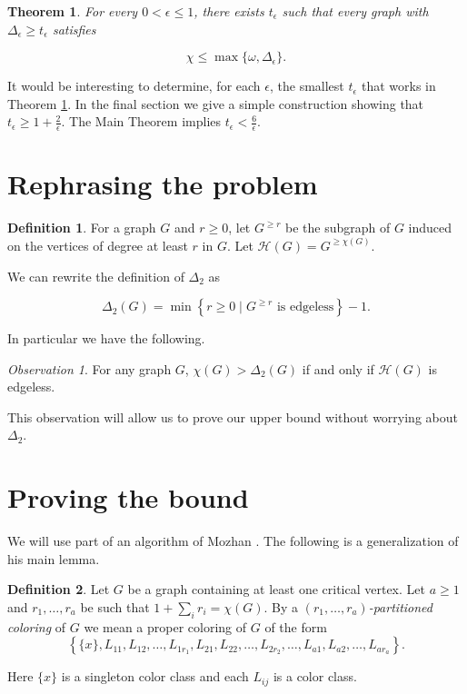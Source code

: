 \documentclass[12pt]{amsart}
\theoremstyle{plain}
\newtheorem{thm}{Theorem}
\theoremstyle{definition}
\newtheorem{defn}{Definition}
\theoremstyle{remark}
\newtheorem*{observation}{Observation}
\begin{document}
\begin{thm}\label{TheoremR}
For every $0 < \epsilon \leq 1$, there exists $t_\epsilon$ such that every graph with $\Delta_\epsilon \geq t_\epsilon$ satisfies 

\[\chi \leq \max\{\omega, \Delta_\epsilon\}.\]
\end{thm}

\noindent It would be interesting to determine, for each $\epsilon$, the smallest $t_\epsilon$ that works in Theorem \ref{TheoremR}. In the final section we give a simple construction showing that $t_\epsilon \geq 1 + \frac{2}{\epsilon}$.  The Main Theorem implies $t_\epsilon < \frac{6}{\epsilon}$.

\section{Rephrasing the problem}

\begin{defn}
For a graph $G$ and $r \geq 0$, let $G^{\geq r}$ be the subgraph of $G$ induced on the vertices of degree at least $r$ in $G$.  Let $\mathcal{H}(G) = G^{\geq \chi(G)}$.
\end{defn}

\noindent We can rewrite the definition of $\Delta_2$ as

\[\Delta_2(G) = \min \left\{r \geq 0 \mid G^{\geq r} \text{ is edgeless} \right\} - 1.\]

\noindent In particular we have the following.
\begin{observation}
For any graph $G$, $\chi(G) > \Delta_2(G)$ if and only if $\mathcal{H}(G)$ is edgeless.
\end{observation}

\noindent This observation will allow us to prove our upper bound without worrying about $\Delta_2$.

\section{Proving the bound}
We will use part of an algorithm of Mozhan \cite{Mozhan}.  The following is a generalization of his main lemma.

\begin{defn}
Let $G$ be a graph containing at least one critical vertex.  Let $a \geq 1$ and $r_1, \ldots, r_a$ be such that $1 + \sum_i r_i = \chi(G)$. By a \emph{$(r_1, \ldots, r_a)$-partitioned coloring} of $G$ we mean a proper coloring of $G$ of the form
\[\left\{\{x\}, L_{11}, L_{12}, \ldots, L_{1r_1}, L_{21}, L_{22}, \ldots, L_{2r_2}, \ldots, L_{a1}, L_{a2}, \ldots, L_{ar_a}\right\}.\]

\noindent Here $\{x\}$ is a singleton color class and each $L_{ij}$ is a color class.
\end{defn}
\end{document}
